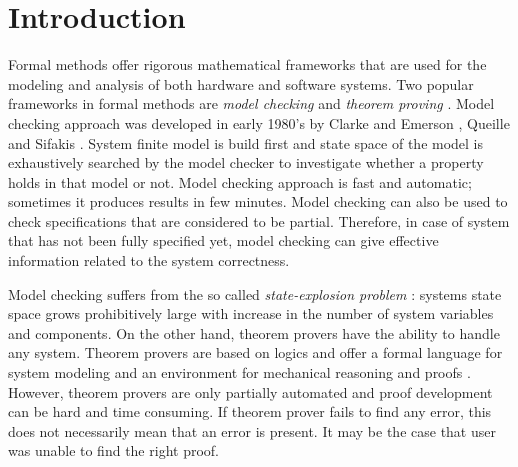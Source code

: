 \documentclass[conference]{IEEEtran}
\begin{document}
\section{Introduction}
Formal methods offer rigorous mathematical frameworks that are used for the modeling and analysis of both hardware and software systems. Two popular 
frameworks in formal methods are \textit{model checking} and \textit{theorem proving} \cite{1}. Model checking approach was developed in early 1980's 
by Clarke and Emerson \cite{2}, Queille and Sifakis \cite{3}. System finite model is build first and state space of the model is exhaustively searched 
by the model checker to investigate whether a property holds in that model or not. Model checking approach is fast and automatic; sometimes it 
produces results in few minutes. Model checking can also be used to check specifications that are considered to be partial. Therefore, in case of 
system that has not been fully specified yet, model checking can give effective information related to the system correctness. 

Model checking suffers from the so called \textit{state-explosion problem} \cite{6}: systems state space grows prohibitively large with increase in 
the number of system variables and components. On the other hand, theorem provers have the ability to handle any system. Theorem provers are based 
on logics and offer a formal language for system modeling and an environment for mechanical reasoning and proofs \cite{5}. However, theorem provers 
are only partially automated and proof development can be hard and time consuming. If theorem prover fails to find any error, this does not 
necessarily mean that an error is present. It may be the case that user was unable to find the right proof. 
\end{document}
